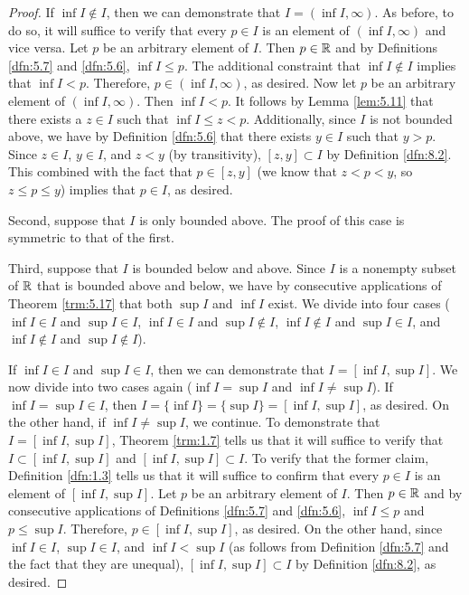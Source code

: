 \documentclass[../main.tex]{subfiles}
\begin{document}
\begin{lemma}
\begin{proof}
        If $\inf I\notin I$, then we can demonstrate that $I=(\inf I,\infty)$. As before, to do so, it will suffice to verify that every $p\in I$ is an element of $(\inf I,\infty)$ and vice versa. Let $p$ be an arbitrary element of $I$. Then $p\in\mathbb{R}$ and by Definitions \ref{dfn:5.7} and \ref{dfn:5.6}, $\inf I\leq p$. The additional constraint that $\inf I\notin I$ implies that $\inf I<p$. Therefore, $p\in(\inf I,\infty)$, as desired. Now let $p$ be an arbitrary element of $(\inf I,\infty)$. Then $\inf I<p$. It follows by Lemma \ref{lem:5.11} that there exists a $z\in I$ such that $\inf I\leq z<p$. Additionally, since $I$ is not bounded above, we have by Definition \ref{dfn:5.6} that there exists $y\in I$ such that $y>p$. Since $z\in I$, $y\in I$, and $z<y$ (by transitivity), $[z,y]\subset I$ by Definition \ref{dfn:8.2}. This combined with the fact that $p\in[z,y]$ (we know that $z<p<y$, so $z\leq p\leq y$) implies that $p\in I$, as desired.\par\smallskip
        Second, suppose that $I$ is only bounded above. The proof of this case is symmetric to that of the first.\par\smallskip
        Third, suppose that $I$ is bounded below and above. Since $I$ is a nonempty subset of $\mathbb{R}$ that is bounded above and below, we have by consecutive applications of Theorem \ref{trm:5.17} that both $\sup I$ and $\inf I$ exist. We divide into four cases ($\inf I\in I$ and $\sup I\in I$, $\inf I\in I$ and $\sup I\notin I$, $\inf I\notin I$ and $\sup I\in I$, and $\inf I\notin I$ and $\sup I\notin I$).\par
        If $\inf I\in I$ and $\sup I\in I$, then we can demonstrate that $I=[\inf I,\sup I]$. We now divide into two cases again ($\inf I=\sup I$ and $\inf I\neq\sup I$). If $\inf I=\sup I\in I$, then $I=\{\inf I\}=\{\sup I\}=[\inf I,\sup I]$, as desired. On the other hand, if $\inf I\neq\sup I$, we continue. To demonstrate that $I=[\inf I,\sup I]$, Theorem \ref{trm:1.7} tells us that it will suffice to verify that $I\subset[\inf I,\sup I]$ and $[\inf I,\sup I]\subset I$. To verify that the former claim, Definition \ref{dfn:1.3} tells us that it will suffice to confirm that every $p\in I$ is an element of $[\inf I,\sup I]$. Let $p$ be an arbitrary element of $I$. Then $p\in\mathbb{R}$ and by consecutive applications of Definitions \ref{dfn:5.7} and \ref{dfn:5.6}, $\inf I\leq p$ and $p\leq\sup I$. Therefore, $p\in[\inf I,\sup I]$, as desired. On the other hand, since $\inf I\in I$, $\sup I\in I$, and $\inf I<\sup I$ (as follows from Definition \ref{dfn:5.7} and the fact that they are unequal), $[\inf I,\sup I]\subset I$ by Definition \ref{dfn:8.2}, as desired.\par

\end{proof}
\end{lemma}
\end{document}
